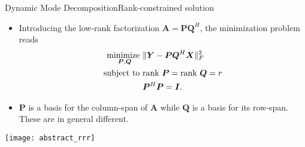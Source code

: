 \begin{frame}[t, c]{Dynamic Mode Decomposition}{Rank-constrained solution}
  \begin{minipage}{.68\textwidth}
    \begin{itemize}
    \item Introducing the low-rank factorization \( \bm{A} = \bm{PQ}^H \), the minimization problem reads
      \[
        \begin{aligned}
          \operatorname*{minimize~}_{\bm{P}, \bm{Q}} & \| \bm{Y} - \bm{PQ}^H \bm{X} \|_F^2 \\
          \operatorname*{subject~to~} & \text{rank } \bm{P} = \text{rank } \bm{Q} = r \\
          & \bm{P}^H \bm{P} = \bm{I}.
        \end{aligned}
      \]
      
      \medskip
      
    \item \( \bm{P} \) is a basis for the column-span of \( \bm{A} \) while \( \bm{Q} \) is a basis for its row-span.
      These are in general different.
    \end{itemize}
  \end{minipage}%
  \hfill
  \begin{minipage}{.28\textwidth}
    \centering
    \texttt{[image: abstract\_rrr]}
  \end{minipage}
  
  \vspace{1cm}
\end{frame}


